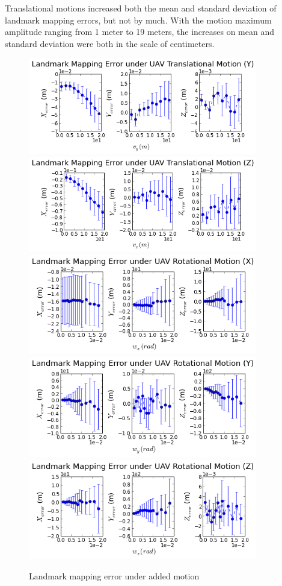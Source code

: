 Translational motions increased both the mean and standard deviation
of landmark mapping errors, but not by much. With the motion maximum
amplitude ranging from 1 meter to 19 meters, the increases on mean and
standard deviation were both in the scale of centimeters.

\begin{figure}[h]
  \centering
  \includegraphics[width=10cm, keepaspectratio=true]{./Figures/SimulationFigures/Figure20.png}
  \includegraphics[width=10cm, keepaspectratio=true]{./Figures/SimulationFigures/Figure21.png}
  \includegraphics[width=10cm, keepaspectratio=true]{./Figures/SimulationFigures/Figure22.png}
  \includegraphics[width=10cm, keepaspectratio=true]{./Figures/SimulationFigures/Figure23.png}
  \includegraphics[width=10cm, keepaspectratio=true]{./Figures/SimulationFigures/Figure24.png}
  \caption{Landmark mapping error under added motion}
  \label{fig:simfig20-24}
\end{figure}

